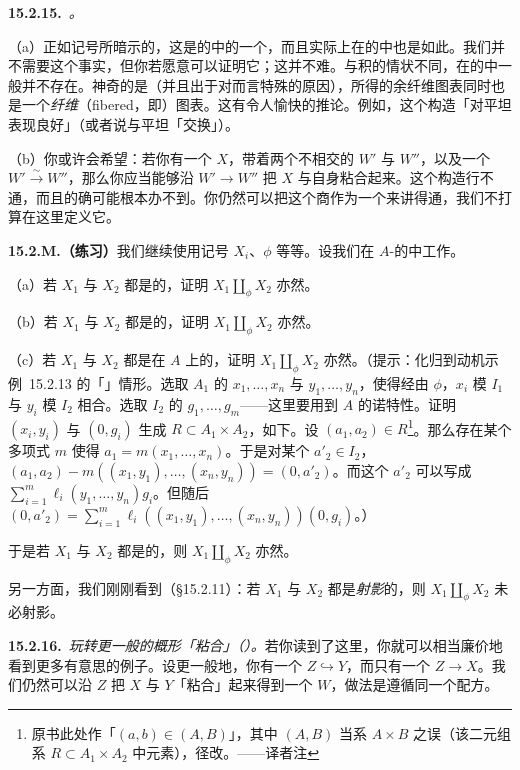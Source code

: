 \textbf{15.2.15.}\ \emph{\trhRemark{}。}

（a）正如记号所暗示的，这是\trScheme{}的\trCategory{}中的一个\trFiberedCoproduct，而且实际上在\trLocallyRingedSpace{}的\trCategory{}中也是如此。我们并不需要这个事实，但你若愿意可以证明它；这并不难。与积的情状不同，\trFiberedCoproduct{}在\trScheme{}的\trCategory{}中一般并不存在。神奇的是（并且出于对\trScheme{}而言特殊的原因），所得的余纤维图表同时也是一个\emph{纤维}（fibered，即\trCartesianDiagram）图表。这有令人愉快的推论。例如，这个构造「对平坦\trBaseChange{}表现良好」（或者说与平坦\trBaseChange{}「交换」）。

（b）你或许会希望：若你有一个\trScheme{} $X$，带着两个不相交的\trClosedSubscheme{} $W'$ 与 $W''$，以及一个\trIsomorphism{} $W'\overset{\sim}{\longrightarrow}W''$，那么你应当能够沿 $W'\to W''$ 把 $X$ 与自身粘合起来。这个构造行不通，而且的确可能根本办不到。你仍然可以把这个商作为一个\trAlgebraicSpace{}来讲得通，我们不打算在这里定义它。

\textbf{15.2.M.（练习）}\quad 我们继续使用记号 $X_i$、$\phi$ 等等。设我们在 $A$-\trScheme{}的\trCategory{}中工作。

（a）若 $X_1$ 与 $X_2$ 都是\trUniversallyClosed{}的，证明 $X_1\amalg_\phi X_2$ 亦然。

（b）若 $X_1$ 与 $X_2$ 都是\trSeparated{}的，证明 $X_1\amalg_\phi X_2$ 亦然。

（c）若 $X_1$ 与 $X_2$ 都是在\trNoether\trRing{} $A$ 上\trFiniteType{}的，证明 $X_1\amalg_\phi X_2$ 亦然。（提示：化归到\mbox{动机示例~15.2.13} 的「\trAffine」情形。选取 $A_1$ 的\trGenerator{} $x_1,\dots,x_n$ 与 $y_1,\dots,y_n$，使得经由 $\phi$，$x_i$ 模 $I_1$ 与 $y_i$ 模 $I_2$ 相合。选取 $I_2$ 的\trGenerator{} $g_1,\dots,g_m$——这里要用到 $A$ 的诺特性。证明 $(x_i,y_i)$ 与 $(0,g_i)$ 生成 $R\subset A_1\times A_2$，如下。设 $(a_1,a_2)\in R$\footnote{原书此处作「$(a,b)\in(A,B)$」，其中 $(A,B)$ 当系 $A\times B$ 之误（该二元组系 $R\subset A_1\times A_2$ 中元素），径改。——译者注}。那么存在某个多项式 $m$ 使得 $a_1=m(x_1,\dots,x_n)$。于是对某个 $a'_2\in I_2$，$(a_1,a_2)-m((x_1,y_1),\dots,(x_n,y_n))=(0,a'_2)$。而这个 $a'_2$ 可以写成 $\sum_{i=1}^m\ell_i(y_1,\dots,y_n)g_i$。但随后 $(0,a'_2)=\sum_{i=1}^m\ell_i((x_1,y_1),\dots,(x_n,y_n))(0,g_i)$。）

于是若 $X_1$ 与 $X_2$ 都是\trProper{}的，则 $X_1\amalg_\phi X_2$ 亦然。

另一方面，我们刚刚看到（\S15.2.11）：若 $X_1$ 与 $X_2$ 都是\emph{射影}的，则 $X_1\amalg_\phi X_2$ 未必射影。

\textbf{15.2.16.}\ \emph{玩转更一般的概形「粘合」（\trCoproduct）。}\quad 若你读到了这里，你就可以相当廉价地看到更多有意思的例子。设更一般地，你有一个\trClosedEmbedding{} $Z\hookrightarrow Y$，而只有一个\trAffine\trMorphism{} $Z\to X$。我们仍然可以沿 $Z$ 把 $X$ 与 $Y$「粘合」起来得到一个\trScheme{} $W$，做法是遵循同一个配方。

